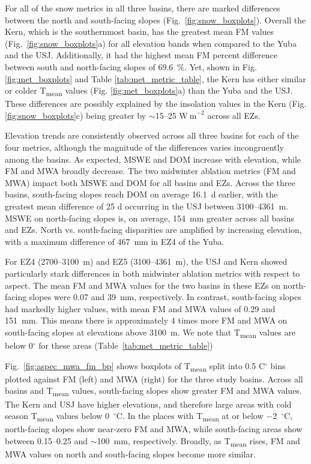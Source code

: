For all of the snow metrics in all three basins, there are marked differences between the north and south-facing slopes (Fig.~\ref{fig:snow_boxplots}). Overall the Kern, which is the southernmost basin, has the greatest mean FM values (Fig.~\ref{fig:snow_boxplots}a) for all elevation bands when compared to the Yuba and the USJ. Additionally, it had the highest mean FM percent difference between south and north-facing slopes of 69.6~\%. Yet, shown in Fig. \ref{fig:met_boxplots} and Table \ref{tab:met_metric_table}, the Kern has either similar or colder T\textsubscript{mean} values (Fig. \ref{fig:met_boxplots}a) than the Yuba and the USJ. These differences are possibly explained by the insolation values in the Kern (Fig. \ref{fig:snow_boxplots}c) being greater by $\sim$15--25 $\mathrm{W~m}^{-2}$ across all EZs. 

Elevation trends are consistently observed across all three basins for each of the four metrics, although the magnitude of the differences varies incongruently among the basins. As expected, MSWE and DOM increase with elevation, while FM and MWA broadly decrease. The two midwinter ablation metrics (FM and MWA) impact both MSWE and DOM for all basins and EZs. Across the three basins, south-facing slopes reach DOM on average 16.1~d earlier, with the greatest mean difference of 25 d occurring in the USJ between 3100--4361~m. MSWE on north-facing slopes is, on average, 154~mm greater across all basins and EZs. North vs. south-facing disparities are amplified by increasing elevation, with a maximum difference of 467~mm in EZ4 of the Yuba.

For EZ4 (2700--3100~m) and EZ5 (3100--4361~m), the USJ and Kern showed particularly stark differences in both midwinter ablation metrics with respect to aspect. The mean FM and MWA values for the two basins in these EZs on north-facing slopes were 0.07 and 39~mm, respectively. In contrast, south-facing slopes had markedly higher values, with mean FM and MWA values of 0.29 and 151~mm. This means there is approximately 4 times more FM and MWA on south-facing slopes at elevations above 3100~m. We note that T\textsubscript{mean} values are below 0$^{\circ}$ for these areas (Table~\ref{tab:met_metric_table})

Fig.~\ref{fig:aspec_mwa_fm_bp} shows boxplots of T\textsubscript{mean} split into 0.5 C$^{\circ}$ bins plotted against FM (left) and MWA (right) for the three study basins. Across all basins and T\textsubscript{mean} values, south-facing slopes show greater FM and MWA values.  The Kern and USJ have higher elevations, and therefore large areas with cold season T\textsubscript{mean} values below 0~$^{\circ}$C. In the places with T\textsubscript{mean} at or below $-$2~$^{\circ}$C, north-facing slopes show near-zero FM and MWA, while south-facing areas show between 0.15--0.25 and $\sim$100~mm, respectively. Broadly, as T\textsubscript{mean} rises, FM and MWA values on north and south-facing slopes become more similar.

